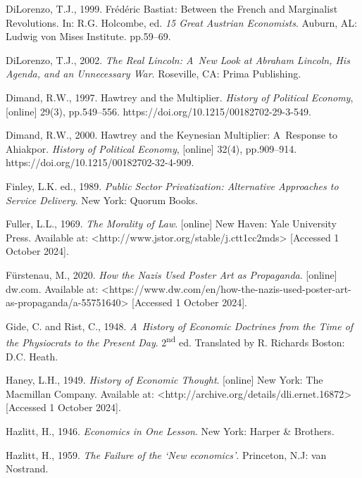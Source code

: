 DiLorenzo, T.J., 1999. Frédéric Bastiat: Between the French and Marginalist Revolutions. In: R.G. Holcombe, ed. \textit{15 Great Austrian Economists}. Auburn, AL: Ludwig von Mises Institute. pp.59–69.



DiLorenzo, T.J., 2002. \textit{The Real Lincoln: A~New Look at Abraham Lincoln, His Agenda, and an Unnecessary War}. Roseville, CA: Prima Publishing.



Dimand, R.W., 1997. Hawtrey and the Multiplier. \textit{History of Political Economy}, [online] 29(3), pp.549–556. https://doi.org/10.1215/00182702-29-3-549.



Dimand, R.W., 2000. Hawtrey and the Keynesian Multiplier: A~Response to Ahiakpor. \textit{History of Political Economy}, [online] 32(4), pp.909–914. https://doi.org/10.1215/00182702-32-4-909.



Finley, L.K. ed., 1989. \textit{Public Sector Privatization: Alternative Approaches to Service Delivery}. New York: Quorum Books.



Fuller, L.L., 1969. \textit{The Morality of Law}. [online] New Haven: Yale University Press. Available at: {\textless}http://www.jstor.org/stable/j.ctt1cc2mds{\textgreater} [Accessed 1 October 2024].



Fürstenau, M., 2020. \textit{How the Nazis Used Poster Art as Propaganda}. [online] dw.com. Available at: {\textless}https://www.dw.com/en/how-the-nazis-used-poster-art-as-propaganda/a-55751640{\textgreater} [Accessed 1 October 2024].



Gide, C. and Rist, C., 1948. \textit{A~History of Economic Doctrines from the Time of the Physiocrats to the Present Day}. 2\textsuperscript{nd} ed. Translated by R. Richards Boston: D.C. Heath.



Haney, L.H., 1949. \textit{History of Economic Thought}. [online] New York: The Macmillan Company. Available at: {\textless}http://archive.org/details/dli.ernet.16872{\textgreater} [Accessed 1 October 2024].



Hazlitt, H., 1946. \textit{Economics in One Lesson}. New York: Harper \& Brothers.



Hazlitt, H., 1959. \textit{The Failure of the ‘New economics'}. Princeton, N.J: van Nostrand.



